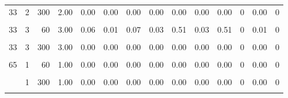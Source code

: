 \begin{table}
\begin{tabular}{rrrrrrrrrrrrrr}
33 & 2 & 300 & 2.00 & 0.00 & 0.00 & 0.00 & 0.00 & 0.00 & 0.00 & 0.00 & 0 & 0.00 & 0\\
\cellcolor{gray!6}{33} & \cellcolor{gray!6}{3} & \cellcolor{gray!6}{30} & \cellcolor{gray!6}{2.41} & \cellcolor{gray!6}{0.70} & \cellcolor{gray!6}{0.61} & \cellcolor{gray!6}{0.67} & \cellcolor{gray!6}{5.11} & \cellcolor{gray!6}{6.70} & \cellcolor{gray!6}{4.33} & \cellcolor{gray!6}{4.97} & \cellcolor{gray!6}{0} & \cellcolor{gray!6}{0.03} & \cellcolor{gray!6}{0}\\
33 & 3 & 60 & 3.00 & 0.06 & 0.01 & 0.07 & 0.03 & 0.51 & 0.03 & 0.51 & 0 & 0.01 & 0\\
\addlinespace
\cellcolor{gray!6}{33} & \cellcolor{gray!6}{3} & \cellcolor{gray!6}{120} & \cellcolor{gray!6}{3.00} & \cellcolor{gray!6}{0.00} & \cellcolor{gray!6}{0.00} & \cellcolor{gray!6}{0.00} & \cellcolor{gray!6}{0.00} & \cellcolor{gray!6}{0.00} & \cellcolor{gray!6}{0.00} & \cellcolor{gray!6}{0.00} & \cellcolor{gray!6}{0} & \cellcolor{gray!6}{0.00} & \cellcolor{gray!6}{0}\\
33 & 3 & 300 & 3.00 & 0.00 & 0.00 & 0.00 & 0.00 & 0.00 & 0.00 & 0.00 & 0 & 0.00 & 0\\
\cellcolor{gray!6}{65} & \cellcolor{gray!6}{1} & \cellcolor{gray!6}{30} & \cellcolor{gray!6}{0.71} & \cellcolor{gray!6}{0.46} & \cellcolor{gray!6}{0.66} & \cellcolor{gray!6}{1.02} & \cellcolor{gray!6}{0.00} & \cellcolor{gray!6}{0.00} & \cellcolor{gray!6}{0.00} & \cellcolor{gray!6}{0.00} & \cellcolor{gray!6}{0} & \cellcolor{gray!6}{0.04} & \cellcolor{gray!6}{0}\\
65 & 1 & 60 & 1.00 & 0.00 & 0.00 & 0.00 & 0.00 & 0.00 & 0.00 & 0.00 & 0 & 0.00 & 0\\
\cellcolor{gray!6}{65} & \cellcolor{gray!6}{1} & \cellcolor{gray!6}{120} & \cellcolor{gray!6}{1.00} & \cellcolor{gray!6}{0.00} & \cellcolor{gray!6}{0.00} & \cellcolor{gray!6}{0.00} & \cellcolor{gray!6}{0.00} & \cellcolor{gray!6}{0.00} & \cellcolor{gray!6}{0.00} & \cellcolor{gray!6}{0.00} & \cellcolor{gray!6}{0} & \cellcolor{gray!6}{0.00} & \cellcolor{gray!6}{0}\\
\addlinespace
65 & 1 & 300 & 1.00 & 0.00 & 0.00 & 0.00 & 0.00 & 0.00 & 0.00 & 0.00 & 0 & 0.00 & 0\\
\cellcolor{gray!6}{65} & \cellcolor{gray!6}{2} & \cellcolor{gray!6}{30} & \cellcolor{gray!6}{1.48} & \cellcolor{gray!6}{0.61} & \cellcolor{gray!6}{0.72} & \cellcolor{gray!6}{0.79} & \cellcolor{gray!6}{8.88} & \cellcolor{gray!6}{10.39} & \cellcolor{gray!6}{8.88} & \cellcolor{gray!6}{10.39} & \cellcolor{gray!6}{0} & \cellcolor{gray!6}{0.03} & \cellcolor{gray!6}{0}\\

\end{tabular}
\end{table}
